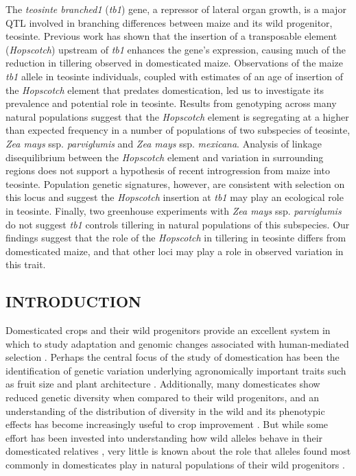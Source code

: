 \documentclass[11pt]{article}
\begin{document}
\begin{linenumbers}
\begin{flushleft}
The \emph{teosinte branched1} (\emph{tb1}) gene, a repressor of lateral organ growth, is a major QTL involved in branching differences between maize and its wild progenitor, teosinte. Previous work has shown that the insertion of a transposable element (\emph{Hopscotch}) upstream of \emph{tb1} enhances the gene's expression, causing much of the reduction in tillering observed in domesticated maize. Observations of the maize \emph{tb1} allele in teosinte individuals, coupled with estimates of an age of insertion of the \emph{Hopscotch} element that predates domestication, led us to investigate its prevalence and potential role in teosinte. Results from genotyping across many natural populations suggest that the \emph{Hopscotch} element is segregating at a higher than expected frequency in a number of populations of two subspecies of teosinte, \emph{Zea mays} ssp. \emph{parviglumis} and \emph{Zea mays} ssp. \emph{mexicana}. Analysis of linkage disequilibrium between the \emph{Hopscotch} element and variation in surrounding regions does not support a hypothesis of recent introgression from maize into teosinte.  Population genetic signatures, however, are consistent with selection on this locus and suggest the \emph{Hopscotch} insertion at \emph{tb1} may play an ecological role in teosinte. Finally, two greenhouse experiments with \emph{Zea mays} ssp. \emph{parviglumis} do not suggest \emph{tb1} controls tillering in natural populations of this subspecies. Our findings suggest that the role of the \emph{Hopscotch} in tillering in teosinte differs from domesticated maize, and that other loci may play a role in observed variation in this trait.  

\clearpage

\begin{centering}
\section*{INTRODUCTION}
\end{centering}


Domesticated crops and their wild progenitors provide an excellent system in which to study adaptation and genomic changes associated with human-mediated selection \citep{Ross-Ibarra2007}. Perhaps the central focus of the study of domestication has been the identification of genetic variation underlying agronomically important traits such as fruit size and plant architecture \citep{OlsenGross2010}. Additionally, many domesticates show reduced genetic diversity when compared to their wild progenitors, and an understanding of the distribution of diversity in the wild and its phenotypic effects has become increasingly useful to crop improvement \citep{KovachMcCouch2008}. But while some effort has been invested into understanding how wild alleles behave in their domesticated relatives \citep[e.g.][]{Bai2007}, very little is known about the role that alleles found most commonly in domesticates play in natural populations of their wild progenitors \citep{Whitton1997}.


\end{flushleft}
\end{linenumbers}
\end{document}
